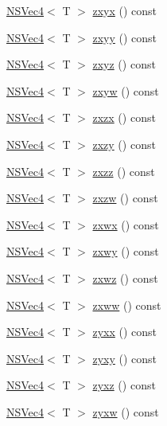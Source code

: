\begin{DoxyCompactItemize}
\item 
\hyperlink{structNSVec4}{N\-S\-Vec4}$<$ T $>$ \hyperlink{structNSVec4_a7582951c1748b321e9c145c6906dd93b}{zxyx} () const 
\item 
\hyperlink{structNSVec4}{N\-S\-Vec4}$<$ T $>$ \hyperlink{structNSVec4_a3d5730a8b56a00a7f34f161670955290}{zxyy} () const 
\item 
\hyperlink{structNSVec4}{N\-S\-Vec4}$<$ T $>$ \hyperlink{structNSVec4_ae78d878c8386ab8c9191f502549ba99b}{zxyz} () const 
\item 
\hyperlink{structNSVec4}{N\-S\-Vec4}$<$ T $>$ \hyperlink{structNSVec4_a2a11cadf4176df78ab5decfb0e7f44ee}{zxyw} () const 
\item 
\hyperlink{structNSVec4}{N\-S\-Vec4}$<$ T $>$ \hyperlink{structNSVec4_a95179fbec5cc15e69e6fa029d2603234}{zxzx} () const 
\item 
\hyperlink{structNSVec4}{N\-S\-Vec4}$<$ T $>$ \hyperlink{structNSVec4_aab3c59d8181060229cec8edc9974e97a}{zxzy} () const 
\item 
\hyperlink{structNSVec4}{N\-S\-Vec4}$<$ T $>$ \hyperlink{structNSVec4_afb39d4ef9fa68f90a4fb6b2002c25c33}{zxzz} () const 
\item 
\hyperlink{structNSVec4}{N\-S\-Vec4}$<$ T $>$ \hyperlink{structNSVec4_a1a3fb859d0a6283d53f75a22739bec49}{zxzw} () const 
\item 
\hyperlink{structNSVec4}{N\-S\-Vec4}$<$ T $>$ \hyperlink{structNSVec4_a366c205f487cc88976c6d2e9fbc384ea}{zxwx} () const 
\item 
\hyperlink{structNSVec4}{N\-S\-Vec4}$<$ T $>$ \hyperlink{structNSVec4_a4bfbb1cdfd78e328f990247b1992a1bc}{zxwy} () const 
\item 
\hyperlink{structNSVec4}{N\-S\-Vec4}$<$ T $>$ \hyperlink{structNSVec4_aa40c9aa816fec005539460b943ea2576}{zxwz} () const 
\item 
\hyperlink{structNSVec4}{N\-S\-Vec4}$<$ T $>$ \hyperlink{structNSVec4_a9aa73ed7cf58434789d25ae4935a2e61}{zxww} () const 
\item 
\hyperlink{structNSVec4}{N\-S\-Vec4}$<$ T $>$ \hyperlink{structNSVec4_ad171095992b12e855fedc38ecba19959}{zyxx} () const 
\item 
\hyperlink{structNSVec4}{N\-S\-Vec4}$<$ T $>$ \hyperlink{structNSVec4_a667417ec044665708e826843be379bf7}{zyxy} () const 
\item 
\hyperlink{structNSVec4}{N\-S\-Vec4}$<$ T $>$ \hyperlink{structNSVec4_a8b80ccf5615c858c1873e2d74f343ea1}{zyxz} () const 
\item 
\hyperlink{structNSVec4}{N\-S\-Vec4}$<$ T $>$ \hyperlink{structNSVec4_a070adfbe8c62a473a4ae3c6841daf7f0}{zyxw} () const 

\end{DoxyCompactItemize}
